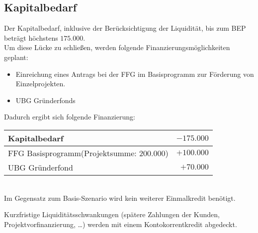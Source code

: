 \subsection{Kapitalbedarf}
Der Kapitalbedarf, inklusive der Berücksichtigung der Liquidität, bis zum BEP beträgt höchstens $175.000$\officialeuro.\\
Um diese Lücke zu schließen, werden folgende Finanzierungsmöglichkeiten geplant:
\begin{itemize}
	\item Einreichung eines Antrags bei der FFG im Basisprogramm zur Förderung von Einzelprojekten.
	\item UBG Gründerfonds
\end{itemize}
Dadurch ergibt sich folgende Finanzierung:\\
\begin{tabular}{l r}
	Kapitalbedarf & $-175.000$\officialeuro \\
	\hline
	FFG Basisprogramm(Projektsumme: $200.000$\officialeuro) & $+100.000$\officialeuro \\
	UBG Gründerfond & $+70.000$\officialeuro \\
	\bottomrule
\end{tabular}\\

\noindent Im Gegensatz zum Basis-Szenario wird kein weiterer Einmalkredit benötigt.

\noindent Kurzfristige Liquiditätsschwankungen (spätere Zahlungen der Kunden, Projektvorfinanzierung, …) werden mit einem Kontokorrentkredit abgedeckt.

\newpage
